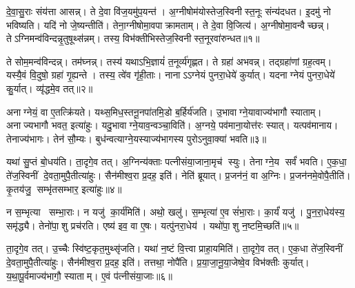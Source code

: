 

\clearpage
{}
\setcounter{anuvakam}{0}
दे॒वा॒सु॒राः संय॑त्ता आसन्न्। ते दे॒वा वि॑ज॒यमु॑प॒यन्त॑। अ॒ग्नीषोम॑योस्तेज॒स्विनीस्त॒नूः संन्य॑दधत। इ॒दमु॑ नो भविष्यति। यदि॑ नो जे॒ष्यन्तीति॑। तेना॒ग्नीषोमा॒वपाक्रामताम्। ते दे॒वा वि॒जित्य॑। अ॒ग्नीषोमा॒वन्वैच्छन्न्। तेऽग्निमन्व॑विन्दन्नृ॒तुषूथ्स॑न्नम्। तस्य॒ विभ॑क्तीभिस्तेज॒स्विनीस्त॒नूरवा॑रुन्धत॥१॥

ते सोम॒मन्व॑विन्दन्न्। तम॑घ्नन्न्। तस्य॑ यथाऽभि॒ज्ञायं॑ त॒नूर्व्य॑गृह्णत। ते ग्रहा॑ अभवन्न्। तद्ग्रहा॑णां ग्रह॒त्वम्। यस्यै॒वं वि॒दुषो॒ ग्रहा॑ गृ॒ह्यन्ते। तस्य॒ त्वे॑व गृ॑ही॒ताः। नानाऽऽग्नेयं पुनरा॒धेये॑ कुर्यात्। यदनाग्नेयं पुनरा॒धेये॑ कु॒र्यात्। व्यृ॑द्धमे॒व तत्॥२॥

अनाग्नेयं॒ वा ए॒तत्क्रि॑यते। यथ्स॒मिध॒स्तनू॒नपा॑तमि॒डो ब॒र्\mbox{}हिर्य॑जति। उ॒भावाग्ने॒यावाज्य॑भागौ स्याताम्। अनाज्यभागौ भवत॒ इत्या॑हुः। यदु॒भावाग्ने॒याव॒न्वञ्चा॒विति॑। अ॒ग्नये॒ पव॑माना॒योत्त॑रः स्यात्। यत्पव॑मानाय। तेनाज्य॑भागः। तेन॑ सौ॒म्यः। बुध॑न्वत्याग्ने॒यस्याज्य॑भागस्य पुरोऽनुवा॒क्या॑ भवति॥३॥

यथा॑ सु॒प्तं बो॒धय॑ति। ता॒दृगे॒व तत्। अ॒ग्निन्य॑क्ताः पत्नीसंया॒जाना॒मृच॑ स्युः। तेनाग्ने॒य सर्वं॑ भवति। ए॒क॒धा॒ ते॑ज॒स्विनीं दे॒वता॒मुपै॒तीत्या॑हुः। सैन॑मीश्व॒रा प्र॒दह॒ इति॑। नेति॑ ब्रूयात्। प्र॒जन॑नं॒ वा अ॒ग्निः। प्र॒जन॑नमे॒वोपै॒तीति॑। कृ॒तय॑जु॒ सम्भृ॑तसम्भार॒ इत्या॑हुः॥४॥

न स॒म्भृत्या सम्भा॒राः। न यजु॑ का॒र्य॑मिति॑। अथो॒ खलु॑। स॒म्भृत्या॑ ए॒व सं॑भा॒राः। का॒र्यं॑ यजु॑। पु॒न॒रा॒धेय॑स्य॒ समृ॑द्ध्यै। तेनो॑पा॒शु प्रच॑रति। एष्य॑ इव॒ वा ए॒षः। यत्पु॑नरा॒धेय॑। यथो॑पा॒शु न॒ष्टमि॒च्छति॑॥५॥

ता॒दृगे॒व तत्। उ॒च्चैः स्वि॑ष्ट॒कृत॒मुथ्सृ॑जति। यथा॑ न॒ष्टं वि॒त्त्वा प्राहा॒यमिति॑। ता॒दृगे॒व तत्। ए॒क॒धा ते॑ज॒स्विनीं दे॒वता॒मुपै॒तीत्या॑हुः। सैन॑मीश्व॒रा प्र॒दह॒ इति॑। तत्तथा॒ नोपै॑ति। प्र॒या॒जा॒नू॒या॒जेष्वे॒व विभ॑क्तीः कुर्यात्। य॒था॒पू॒र्वमाज्य॑भागौ॒ स्याताम्। ए॒वं प॑त्नीसंया॒जाः॥६॥

